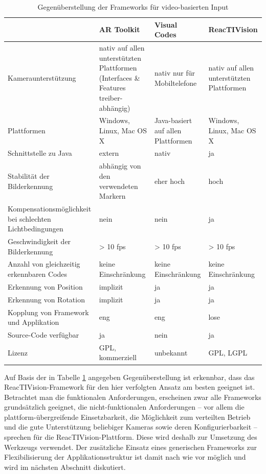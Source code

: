 \begin{table}[htbp]
	\centering
	\caption{Gegenüberstellung der Frameworks für video-basierten Input}
	\begin{tabular}{| p{3cm} || p{3cm} | p{3cm} | p{3cm} |} \hline
		 & AR Toolkit & Visual Codes & ReacTIVision \\ \hline \hline
		Kamera\-unterstützung 		  		& nativ auf allen unterstützten Plattformen (Interfaces \& Features treiber-abhängig) & nativ nur für Mobiltelefone & nativ auf allen unterstützten Plattformen \\ \hline
		Plattformen 			  	  		&  Windows, Linux, Mac OS X  & Java-basiert auf allen Plattformen & Windows, Linux, Mac OS X \\ \hline
		Schnittstelle zu Java 		  		& extern & nativ & ja \\ \hline
		Stabilität der Bilderkennung 	  	& abhängig von den verwendeten Markern & eher hoch & hoch \\ \hline
		Kompensations\-möglichkeit bei schlechten Lichtbedingungen & nein & nein & ja \\ \hline
		Geschwindigkeit der Bilderkennung 	& > 10 fps & > 10 fps & > 10 fps \\ \hline
		Anzahl von gleichzeitig erkennbaren Codes 		  			& keine Einschränkung & keine Einschränkung & keine Einschränkung \\ \hline
		Erkennung von Position 		  		& implizit & ja & ja \\ \hline
		Erkennung von Rotation 				& implizit & ja & ja \\ \hline
		Kopplung von Framework und Applikation & eng & eng & lose \\ \hline
		Source-Code verfügbar 			  	& ja & nein & ja \\ \hline
		Lizenz 				 				& GPL, kommerziell & unbekannt & GPL, LGPL \\ \hline
	\end{tabular}
	\label{tab:videobasierterInput}
\end{table}

Auf Basis der in Tabelle \ref{tab:videobasierterInput} angegeben Gegenüberstellung ist erkennbar, dass das ReacTIVision-Framework für den hier verfolgten Ansatz am besten geeignet ist. Betrachtet man die funktionalen Anforderungen, erscheinen zwar alle Frameworks grundsätzlich geeignet, die nicht-funktionalen Anforderungen -- vor allem die plattform-übergreifende Einsetzbarkeit, die Möglichkeit zum verteilten Betrieb und die gute Unterstützung beliebiger Kameras sowie deren Konfigurierbarkeit -- sprechen für die ReacTIVision-Plattform. Diese wird deshalb zur Umsetzung des Werkzeugs verwendet. Der zusätzliche Einsatz eines generischen Frameworks zur Flexibilisierung der Applikationsstruktur ist damit nach wie vor möglich und wird im nächsten Abschnitt diskutiert.

